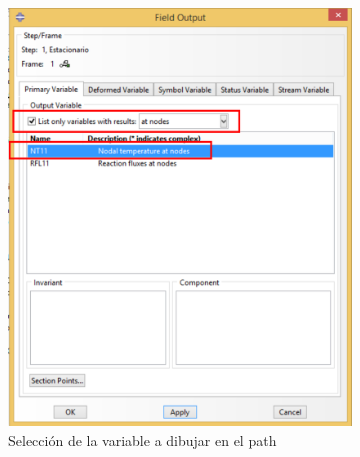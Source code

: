 \begin{itemize}
\begin{figure}[!h]
\begin{subfigure}[!h]{0.33\textwidth}
      \includegraphics[width=\textwidth]{./body/images/post32.pdf}
      \caption{Selección de la variable a dibujar en el path}
      \label{post32}
    \end{subfigure}%
    \begin{subfigure}[!h]{0.33\textwidth}

\end{subfigure}
\end{figure}
\end{itemize}
